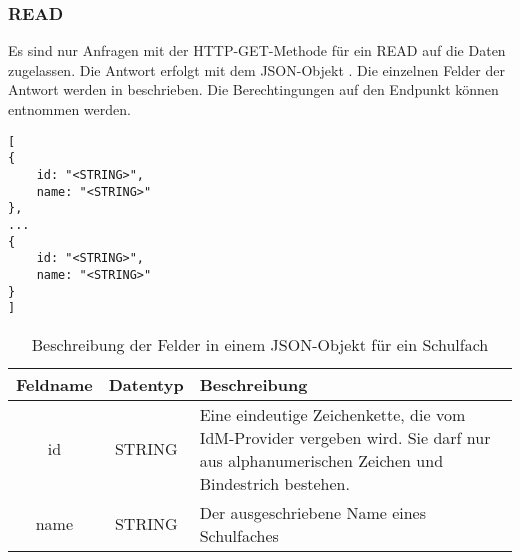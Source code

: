 \subsubsection{READ}
\label{sec:end:rest:api:school-subjects:read}
Es sind nur Anfragen mit der HTTP-GET-Methode für ein READ auf die Daten zugelassen.
Die Antwort erfolgt mit dem JSON-Objekt . Die einzelnen Felder der Antwort werden in  beschrieben.
Die Berechtingungen auf den Endpunkt können  entnommen werden.

\begin{lstlisting}[caption={JSON-Antwort für einen GET-Aufruf des Pfads /api/school-subjects},label={lst:code:end:rest:api:school-subjects:read:ret},frame=tlrb]
[
{
	id: "<STRING>",
	name: "<STRING>"
},
...
{
	id: "<STRING>",
	name: "<STRING>"
}
]
\end{lstlisting}
\begin{table}[htb]
	\begin{tabularx}{\textwidth}{|c|c|X|}
		\hline
			\textbf{Feldname} & \textbf{Datentyp} & \textbf{Beschreibung} \\ \hline
			id & STRING & Eine eindeutige Zeichenkette, die vom IdM-Provider vergeben wird. Sie darf nur aus alphanumerischen Zeichen und Bindestrich bestehen.\\ \hline
			name & STRING & Der ausgeschriebene Name eines Schulfaches \\ \hline
	\end{tabularx}

		\caption{Beschreibung der Felder in einem JSON-Objekt für ein Schulfach}
		\label{tab:end:rest:api:school-subjects:read:ret:json}
\end{table}